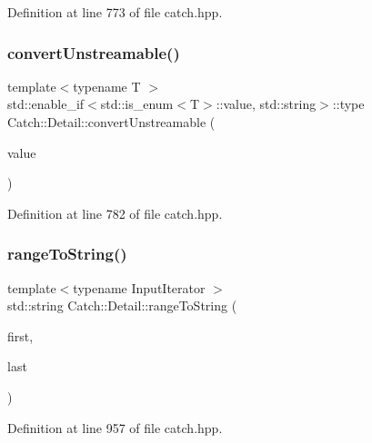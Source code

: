 Definition at line 773 of file catch.\+hpp.

\mbox{\label{namespace_catch_1_1_detail_abf38276f70bd8b4d9ffe61c6e042304b}} 
\subsubsection{\texorpdfstring{convert\+Unstreamable()}{convertUnstreamable()}\hspace{0.1cm}{\footnotesize\ttfamily [2/2]}}
{\footnotesize\ttfamily template$<$typename T $>$ \\
std\+::enable\+\_\+if$<$std\+::is\+\_\+enum$<$T$>$\+::value, std\+::string$>$\+::type Catch\+::\+Detail\+::convert\+Unstreamable (\begin{DoxyParamCaption}\item[{T const \&}]{value }\end{DoxyParamCaption})}



Definition at line 782 of file catch.\+hpp.

\mbox{\label{namespace_catch_1_1_detail_a6650a1dff325bf29962ff15ae73fd972}} 
\subsubsection{\texorpdfstring{range\+To\+String()}{rangeToString()}}
{\footnotesize\ttfamily template$<$typename Input\+Iterator $>$ \\
std\+::string Catch\+::\+Detail\+::range\+To\+String (\begin{DoxyParamCaption}\item[{Input\+Iterator}]{first,  }\item[{Input\+Iterator}]{last }\end{DoxyParamCaption})}



Definition at line 957 of file catch.\+hpp.

\mbox{\label{namespace_catch_1_1_detail_ac5d6c510e565ee5bddcc2236194ce29e}} 
